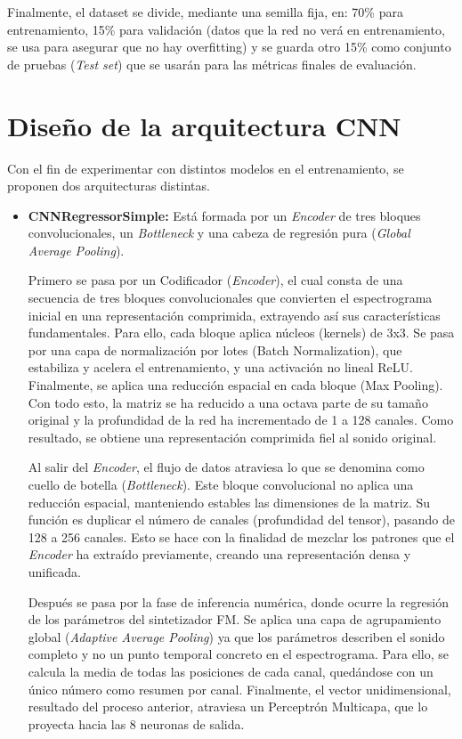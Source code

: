 \begin{enumerate}
Finalmente, el dataset se divide, mediante una semilla fija, en: 70\% para entrenamiento, 15\% para validación (datos que la red no verá en entrenamiento,
se usa para asegurar que no hay overfitting) y se guarda otro 15\% como conjunto de pruebas (\textit{Test set}) que se usarán para las métricas finales de evaluación.

\end{enumerate}

\section{Diseño de la arquitectura CNN}
\label{sec:ArquitecturaCNN}
Con el fin de experimentar con distintos modelos en el entrenamiento, se proponen dos arquitecturas distintas.

\begin{itemize}
    \item \textbf{CNNRegressorSimple: }Está formada por un \textit{Encoder} de tres bloques convolucionales,
    un \textit{Bottleneck} y una cabeza de regresión pura (\textit{Global Average Pooling}). 

    Primero se pasa por un Codificador (\textit{Encoder}), el cual consta de una secuencia de tres bloques
    convolucionales que convierten el espectrograma inicial en una representación comprimida, extrayendo así sus 
    características fundamentales. Para ello, cada bloque aplica núcleos (kernels) de 3x3. Se pasa por una capa de normalización por lotes (Batch Normalization), que estabiliza y acelera el entrenamiento, y 
    una activación no lineal ReLU. Finalmente, se aplica una reducción espacial en cada bloque (Max Pooling).
    Con todo esto, la matriz se ha reducido a una octava parte de su tamaño original y la profundidad de la red
    ha incrementado de 1 a 128 canales. Como resultado, se obtiene una representación comprimida fiel al sonido original.

    Al salir del \textit{Encoder}, el flujo de datos atraviesa lo que se denomina como
    cuello de botella (\textit{Bottleneck}). Este bloque convolucional no
    aplica una reducción espacial, manteniendo estables las dimensiones de la matriz. Su función es duplicar el número
    de canales (profundidad del tensor), pasando de 128 a 256 canales. Esto se hace con la finalidad de 
    mezclar los patrones que el \textit{Encoder} ha extraído previamente, creando una representación
    densa y unificada.

    Después se pasa por la fase de inferencia numérica, donde ocurre la regresión de los parámetros del sintetizador FM. Se aplica una capa de agrupamiento global (\textit{Adaptive Average Pooling}) ya que los 
    parámetros describen el sonido completo y no un punto temporal concreto en el espectrograma.
    Para ello, se calcula la media de todas las posiciones de cada canal, quedándose con un único
    número como resumen por canal. Finalmente, el vector unidimensional, resultado del proceso anterior,
    atraviesa un Perceptrón Multicapa, que lo proyecta hacia las 8 neuronas de salida.
    

\end{itemize}
